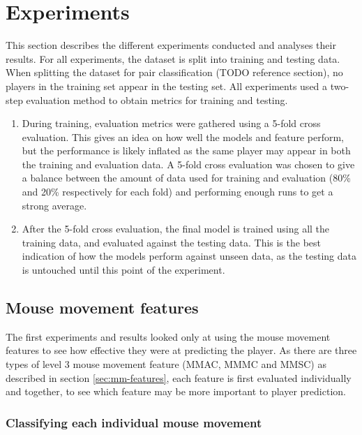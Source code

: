 \documentclass[Report.tex]{subfiles}
\begin{document}
\fifteenPairCV
\section{Experiments}
This section describes the different experiments conducted and analyses their results. For all experiments, the dataset is split into training and testing data. When splitting the dataset for pair classification (TODO reference section), no players in the training set appear in the testing set. All experiments used a two-step evaluation method to obtain metrics for training and testing.
\begin{enumerate}
\item During training, evaluation metrics were gathered using a 5-fold cross evaluation. This gives an idea on how well the models and feature perform, but the performance is likely inflated as the same player may appear in both the training and evaluation data. A 5-fold cross evaluation was chosen to give a balance between the amount of data used for training and evaluation (80\% and 20\% respectively for each fold) and performing enough runs to get a strong average. 
\item After the 5-fold cross evaluation, the final model is trained using all the training data, and evaluated against the testing data. This is the best indication of how the models perform against unseen data, as the testing data is untouched until this point of the experiment. 
\end{enumerate}

\subsection{Mouse movement features}\label{sec:mm-features-results}
The first experiments and results looked only at using the mouse movement features to see how effective they were at predicting the player. As there are three types of level 3 mouse movement feature (MMAC, MMMC and MMSC) as described in section \ref{sec:mm-features}, each feature is first evaluated individually and together, to see which feature may be more important to player prediction. 


\subsubsection{Classifying each individual mouse movement}\label{sec:move-results}
\end{document}
